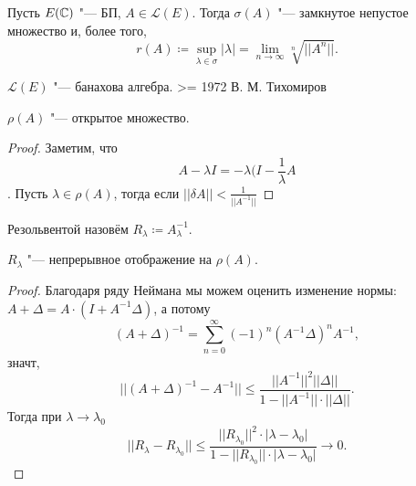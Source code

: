 \documentclass[main]{subfiles}
\begin{document}
\begin{theorem}
  Пусть $E(\mathbb{C})$ "--- БП, $A \in \mathcal{L}(E)$.
  Тогда $\sigma(A)$ "--- замкнутое непустое множество
  и, более того,
  \[
    r(A) \coloneqq \sup_{\lambda \in \sigma} |\lambda| =
    \lim_{n \to \infty} \sqrt[n]{||A^n||}.
  \]
\end{theorem}

$\mathcal{L}(E)$ "--- банахова алгебра.
>= 1972 В. М. Тихомиров

\begin{proposition} %
  $\rho(A)$ "--- открытое множество.
\end{proposition}
\begin{proof}
  Заметим, что
  \[
    A - \lambda I = -\lambda (I - \frac{1}{\lambda} A
  \].
  Пусть $\lambda \in \rho(A)$, тогда
  если $||\delta A|| < \frac{1}{||A^{-1}||}$
\end{proof}

%
Резольвентой назовём $R_\lambda \coloneqq A_\lambda^{-1}$.


\begin{proposition} %
  $R_\lambda$ "--- непрерывное отображение на $\rho(A)$.
\end{proposition}
\begin{proof}
  Благодаря ряду Неймана мы можем оценить изменение нормы:
  \( A + \Delta = A \cdot (I + A^{-1} \Delta) \),
  а потому
  \[
    (A + \Delta)^{-1} = \sum_{n=0}^\infty (-1)^n (A^{-1} \Delta)^n A^{-1},
  \]
  значт,
  \[
    ||(A + \Delta)^{-1} - A^{-1}|| \le \frac{||A^{-1}||^2 ||\Delta||}
    {1 - ||A^{-1}|| \cdot ||\Delta||}.
  \] %
  Тогда при \( \lambda \to \lambda_0 \)
  \[
    ||R_{\lambda} - R_{\lambda_0}|| \le
    \frac{||R_{\lambda_0}||^2 \cdot |\lambda - \lambda_0|}
    {1 - ||R_{\lambda_0}|| \cdot |\lambda - \lambda_0|} \to 0.
  \]
\end{proof}
\end{document}

